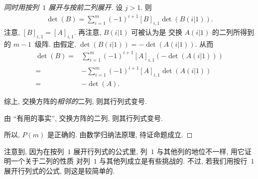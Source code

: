 \begin{proof}[同时用按列~\(1\) 展开与按前二列展开]
    设 \(j > 1\).
    则
    \begin{align*}
        \det {(B)}
        = \sum_{i = 1}^{m}
        {(-1)^{i + 1} [B]_{i,1} \det {(B(i|1))}}.
    \end{align*}
    注意, \([B]_{i,1} = [A]_{i,1}\).
    再注意, \(B(i|1)\) 可被认为是%
    交换 \(A(i|1)\) 的二列所得到的 \(m-1\)~级阵.
    由假定, \(\det {(B(i|1))} = -\det {(A(i|1))}\).
    从而
    \begin{align*}
        \det {(B)}
        = {} &
        \sum_{i = 1}^{m}
        {(-1)^{i + 1} [A]_{i,1} (-\det {(A(i|1))})}
        \\
        = {} &
        {-\sum_{i = 1}^{m}
        {(-1)^{i + 1} [A]_{i,1} \det {(A(i|1))}}}
        \\
        = {} &
        {-\det {(A)}}.
    \end{align*}

    综上,
    交换方阵的\emph{相邻的}二列,
    则其行列式变号.

    由 ``有用的事实'',
    交换方阵的二列,
    则其行列式变号.

    所以, \(P(m)\) 是正确的.
    由数学归纳法原理, 待证命题成立.
\end{proof}

注意到, 因为在按列~\(1\) 展开行列式的公式里,
列~\(1\) 与其他列的地位不一样,
用它证明一个关于二列的性质%
对列~\(1\) 与其他列成立是有些挑战的.
不过, 若我们用按行~\(1\) 展开行列式的公式,
则这是较简单的.

